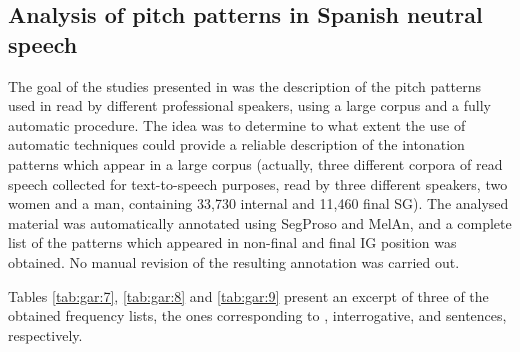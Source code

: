 \documentclass[output=paper]{langsci/langscibook}
\begin{document}
\subsection{Analysis of pitch patterns in Spanish neutral speech}

The goal of the studies presented in \citep{Garrido2012enton,Garrido2012acent} was the description of the pitch patterns used in  read  by different professional speakers, using a large corpus and a fully automatic procedure. The idea was to determine to what extent the use of automatic techniques could provide a reliable description of the intonation patterns which appear in a large corpus (actually, three different corpora of read speech collected for text-to-speech purposes, read by three different speakers, two women and a man, containing 33,730 internal and 11,460 final SG). The analysed material was automatically annotated using SegProso and MelAn, and a complete list of the patterns which appeared in non-final \citep{Garrido2012acent} and final \citep{Garrido2012enton} IG position was obtained. No manual revision of the resulting annotation was carried out.

Tables \ref{tab:gar:7}, \ref{tab:gar:8} and \ref{tab:gar:9}  present an excerpt of three of the obtained frequency lists, the ones corresponding to , interrogative, and  sentences, respectively.\largerpage
\end{document}
